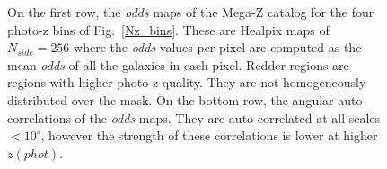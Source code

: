 \begin{figure}
\centering
{}
\caption{On the first row, the \textit{odds} maps of the Mega-Z catalog for the four photo-z bins of Fig.~\ref{Nz_bins}. These are Healpix maps of $N_{side}=256$ where the \textit{odds} values per pixel are computed as the mean \textit{odds} of all the galaxies in each pixel. Redder regions are regions with higher photo-z quality. They are not homogeneously distributed over the mask. 
On the bottom row, the angular auto correlations of the \textit{odds} maps. They are auto correlated at all scales $<10^\circ$, however the strength of these correlations is lower at higher $z(phot)$.}
\label{od_map}
\end{figure}

